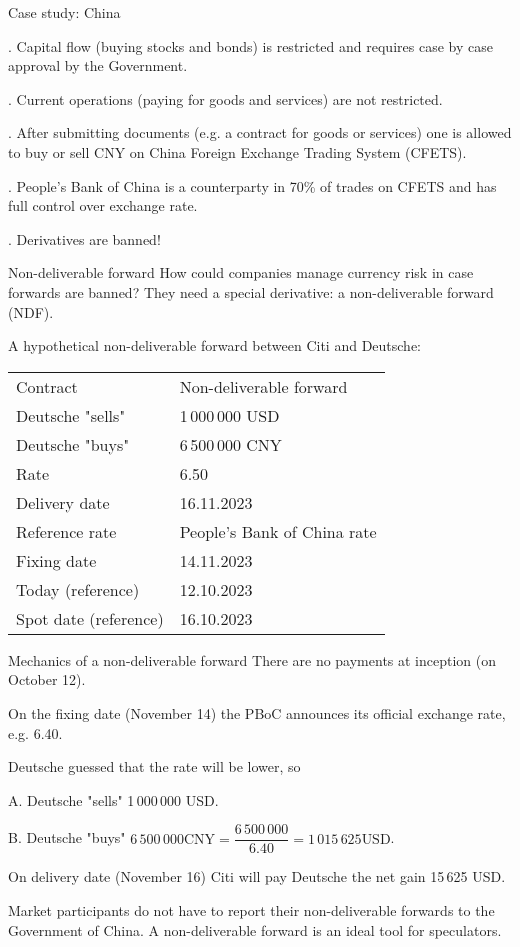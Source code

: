 \documentclass{beamer}
\begin{document}
\begin{frame}{Case study: China}

. Capital flow (buying stocks and bonds) is restricted and requires case by case approval by the Government.

. Current operations (paying for goods and services) are not restricted.

. After submitting documents (e.g. a contract for goods or services) one is allowed to buy or sell CNY on  China Foreign Exchange Trading System (CFETS).

. People's Bank of China is a counterparty in 70\% of trades on CFETS and has full control over exchange rate.

. Derivatives are banned!

\end{frame}



\begin{frame}{Non-deliverable forward}
\justify
How could companies manage currency risk in case forwards are banned? They need a special derivative: a \alert{non-deliverable forward (NDF)}.

\justify
A hypothetical non-deliverable forward between Citi and Deutsche:

\justify
\centering
\begin{tabular}{l|l}
	Contract & Non-deliverable forward		\\
	Deutsche "sells"  & 1\,000\,000 USD	\\
	Deutsche "buys" & 6\,500\,000 CNY		\\
	Rate		 		      & 6.50 						\\
	Delivery date	   & 16.11.2023 \\
	Reference rate	   & People's Bank of China rate	\\
	Fixing date		   & 14.11.2023 \\
	Today (reference)	& 12.10.2023 \\
	Spot date (reference) & 16.10.2023
\end{tabular}
\end{frame}



\begin{frame}{Mechanics of a non-deliverable forward}
\justify
There are no payments at inception (on October 12).

\justify
On the fixing date (November 14) the PBoC announces its official exchange rate, e.g. 6.40.

\justify
Deutsche guessed that the rate will be lower, so

A. Deutsche "sells" 1\,000\,000 USD.

B. Deutsche "buys" $6\,500\,000 \text{CNY} = \dfrac{6\,500\,000}{6.40} = 1\,015\,625 \text{USD}$.

\justify
On delivery date (November 16) Citi will pay Deutsche the net gain 15\,625 USD.

\justify
Market participants do not have to report their non-deliverable forwards to the Government of China. A non-deliverable forward is an ideal tool for speculators.
\end{frame}
\end{document}
